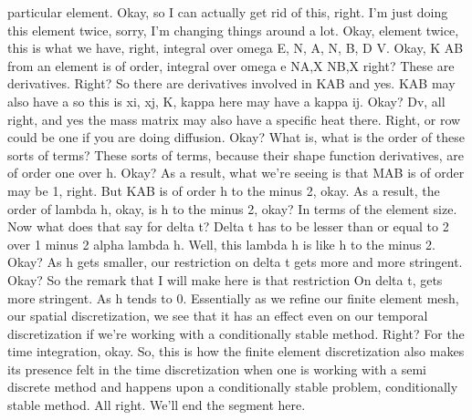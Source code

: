 \documentclass[10pt]{article}
\begin{document}
particular element. Okay, so I can actually get rid of this, right. I'm just doing this element twice, sorry, I'm changing things around a lot. Okay, element twice, this is what we have, right, integral over omega E, N, A, N, B, D V. Okay, K AB from an element is of order, integral over omega e NA,X NB,X right? These are derivatives. Right? So there are derivatives involved in KAB and yes. KAB may also have a so this is xi, xj, K, kappa here may have a kappa ij. Okay? Dv, all right, and yes the mass matrix may also have a specific heat there. Right, or row could be one if you are doing diffusion. Okay? What is, what is the order of these sorts of terms? These sorts of terms, because their shape function derivatives, are of order one over h. Okay? As a result, what we're seeing is that MAB is of order may be 1, right. But KAB is of order h to the minus 2, okay. As a result, the order of lambda h, okay, is h to the minus 2, okay? In terms of the element size. Now what does that say for delta t? Delta t has to be lesser than or equal to 2 over 1 minus 2 alpha lambda h. Well, this lambda h is like h to the minus 2. Okay? As h gets smaller, our restriction on delta t gets more and more stringent. Okay? So the remark that I will make here is that restriction On delta t, gets more stringent. As h tends to 0. Essentially as we refine our finite element mesh, our spatial discretization, we see that it has an effect even on our temporal discretization if we're working with a conditionally stable method. Right? For the time integration, okay. So, this is how the finite element discretization also makes its presence felt in the time discretization when one is working with a semi discrete method and happens upon a conditionally stable problem, conditionally stable method. All right. We'll end the segment here.
\end{document}
